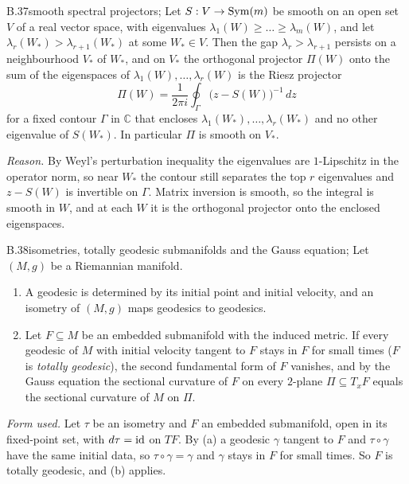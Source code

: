 \begin{auxresult}{B.37}{smooth spectral projectors}{\citep[Ch.~I, \S5 and Ch.~II, \S1]{xkato1995perturbation};
\citep[Ch.~III]{xbhatia1997matrix}}
Let $S:V\to\mathrm{Sym}(m)$ be smooth on an open set $V$ of a real vector space, with eigenvalues
$\lambda_1(W)\ge\dots\ge\lambda_m(W)$, and let $\lambda_r(W_*)>\lambda_{r+1}(W_*)$ at some $W_*\in V$. Then the gap
$\lambda_r>\lambda_{r+1}$ persists on a neighbourhood $V_*$ of $W_*$, and on $V_*$ the orthogonal projector $\Pi(W)$ onto the
sum of the eigenspaces of $\lambda_1(W),\dots,\lambda_r(W)$ is the Riesz projector
\[\Pi(W)=\frac1{2\pi i}\oint_\Gamma\big(z-S(W)\big)^{-1}\,dz\]
for a fixed contour $\Gamma$ in $\mathbb C$ that encloses $\lambda_1(W_*),\dots,\lambda_r(W_*)$ and no other eigenvalue of
$S(W_*)$. In particular $\Pi$ is smooth on $V_*$.
\end{auxresult}
\noindent\emph{Reason.} By Weyl's perturbation inequality the eigenvalues are $1$-Lipschitz in the operator norm, so
near $W_*$ the contour still separates the top $r$ eigenvalues and $z-S(W)$ is invertible on $\Gamma$. Matrix inversion
is smooth, so the integral is smooth in $W$, and at each $W$ it is the orthogonal projector onto the enclosed eigenspaces.

\begin{auxresult}{B.38}{isometries, totally geodesic submanifolds and the Gauss equation}{\citep[Ch.~4, 5 and
8]{xlee2018introduction}; \citep{xkobayashi1958fixed}}
Let $(M,g)$ be a Riemannian manifold.
\begin{enumerate}[label=(\alph*)]
  \item A geodesic is determined by its initial point and initial velocity, and an isometry of $(M,g)$ maps geodesics to
    geodesics.
  \item Let $F\subseteq M$ be an embedded submanifold with the induced metric. If every geodesic of $M$ with initial
    velocity tangent to $F$ stays in $F$ for small times ($F$ is \emph{totally geodesic}), the second fundamental form of
    $F$ vanishes, and by the Gauss equation the sectional curvature of $F$ on every $2$-plane $\Pi\subseteq T_xF$ equals
    the sectional curvature of $M$ on $\Pi$.
\end{enumerate}
\end{auxresult}
\noindent\emph{Form used.} Let $\tau$ be an isometry and $F$ an embedded submanifold, open in its fixed-point set, with
$d\tau=\mathrm{id}$ on $TF$. By (a) a geodesic $\gamma$ tangent to $F$ and $\tau\circ\gamma$ have the same initial data, so
$\tau\circ\gamma=\gamma$ and $\gamma$ stays in $F$ for small times. So $F$ is totally geodesic, and (b) applies.


